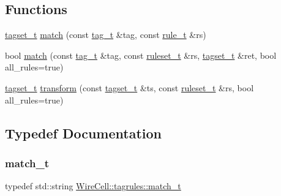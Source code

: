 \subsection*{Functions}
\begin{DoxyCompactItemize}
\item 
\hyperlink{namespace_wire_cell_1_1tagrules_a80263165e3d13e49e317c045829f76cb}{tagset\+\_\+t} \hyperlink{namespace_wire_cell_1_1tagrules_aed120ffc74c8d10ff4498490ec742f87}{match} (const \hyperlink{namespace_wire_cell_1_1tagrules_ae74af6e8edaf0f64b70f6df4e0b66cdc}{tag\+\_\+t} \&tag, const \hyperlink{namespace_wire_cell_1_1tagrules_abc013e08147e32e1661654bb3e768151}{rule\+\_\+t} \&rs)
\item 
bool \hyperlink{namespace_wire_cell_1_1tagrules_a307c2349fd136058ba33924faff92553}{match} (const \hyperlink{namespace_wire_cell_1_1tagrules_ae74af6e8edaf0f64b70f6df4e0b66cdc}{tag\+\_\+t} \&tag, const \hyperlink{namespace_wire_cell_1_1tagrules_a93f5672d7c60d5f990b42dd93fd0aee2}{ruleset\+\_\+t} \&rs, \hyperlink{namespace_wire_cell_1_1tagrules_a80263165e3d13e49e317c045829f76cb}{tagset\+\_\+t} \&ret, bool all\+\_\+rules=true)
\item 
\hyperlink{namespace_wire_cell_1_1tagrules_a80263165e3d13e49e317c045829f76cb}{tagset\+\_\+t} \hyperlink{namespace_wire_cell_1_1tagrules_a8e7dac6e5d8aa67bbe4c801a1738d170}{transform} (const \hyperlink{namespace_wire_cell_1_1tagrules_a80263165e3d13e49e317c045829f76cb}{tagset\+\_\+t} \&ts, const \hyperlink{namespace_wire_cell_1_1tagrules_a93f5672d7c60d5f990b42dd93fd0aee2}{ruleset\+\_\+t} \&rs, bool all\+\_\+rules=true)
\end{DoxyCompactItemize}


\subsection{Typedef Documentation}
\mbox{\label{namespace_wire_cell_1_1tagrules_ab71a655969745fcd6a4aecf278fa9333}} 
\subsubsection{\texorpdfstring{match\+\_\+t}{match\_t}}
{\footnotesize\ttfamily typedef std\+::string \hyperlink{namespace_wire_cell_1_1tagrules_ab71a655969745fcd6a4aecf278fa9333}{Wire\+Cell\+::tagrules\+::match\+\_\+t}}



